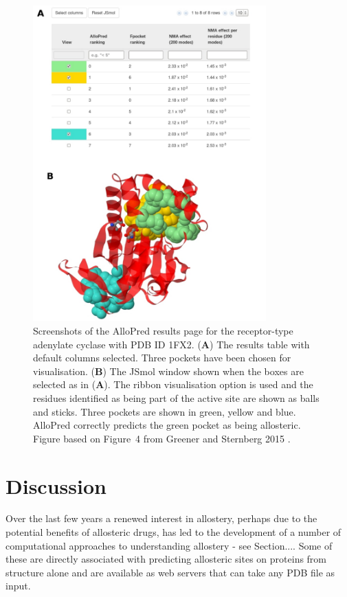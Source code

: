 \begin{figure}
\centering

\includegraphics[width=0.8\textwidth]{figures/web_results/web_results}

\caption{Screenshots of the AlloPred results page for the receptor-type adenylate cyclase with PDB ID 1FX2.
(\textbf{A}) The results table with default columns selected.
Three pockets have been chosen for visualisation.
(\textbf{B}) The JSmol window shown when the boxes are selected as in (\textbf{A}).
The ribbon visualisation option is used and the residues identified as being part of the active site are shown as balls and sticks.
Three pockets are shown in green, yellow and blue.
AlloPred correctly predicts the green pocket as being allosteric.
Figure based on Figure~4 from Greener and Sternberg 2015 \cite{Greener2015}.}

\label{fig:web_results}
\end{figure}


\section{Discussion}

Over the last few years a renewed interest in allostery, perhaps due to the potential benefits of allosteric drugs, has led to the development of a number of computational approaches to understanding allostery - see Section....
Some of these are directly associated with predicting allosteric sites on proteins from structure alone and are available as web servers that can take any PDB file as input.

